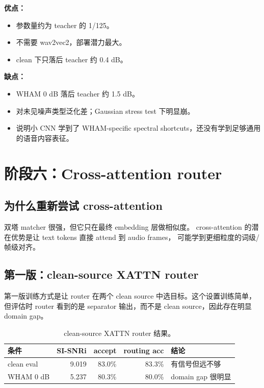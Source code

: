 \documentclass[UTF8,zihao=-4]{ctexart}
\begin{document}
\textbf{优点：}
\begin{itemize}
  \item 参数量约为 teacher 的 1/125。
  \item 不需要 wav2vec2，部署潜力最大。
  \item clean 下只落后 teacher 约 0.4 dB。
\end{itemize}

\textbf{缺点：}
\begin{itemize}
  \item WHAM 0 dB 落后 teacher 约 1.5 dB。
  \item 对未见噪声类型泛化差；Gaussian stress test 下明显崩。
  \item 说明小 CNN 学到了 WHAM-specific spectral shortcuts，还没有学到足够通用的语音内容表征。
\end{itemize}

\section{阶段六：Cross-attention router}

\subsection{为什么重新尝试 cross-attention}

双塔 matcher 很强，但它只在最终 embedding 层做相似度。
cross-attention 的潜在优势是让 text tokens 直接 attend 到 audio frames，
可能学到更细粒度的词级/帧级对齐。

\subsection{第一版：clean-source XATTN router}

第一版训练方式是让 router 在两个 clean source 中选目标。这个设置训练简单，但评估时 router 看到的是
separator 输出，而不是 clean source，因此存在明显 domain gap。

\begin{table}[h]
\centering
\begin{tabularx}{\linewidth}{lrrrX}
\toprule
条件 & SI-SNRi & accept & routing acc & 结论 \\
\midrule
clean eval & 9.019 & 83.0\% & 83.3\% & 有信号但远不够 \\
WHAM 0 dB & 5.237 & 80.3\% & 80.0\% & domain gap 很明显 \\
\bottomrule
\end{tabularx}
\caption{clean-source XATTN router 结果。}
\end{table}
\end{document}
